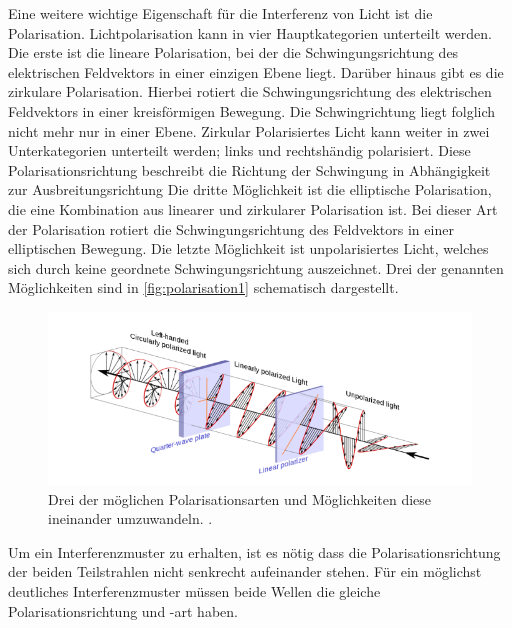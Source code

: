 Eine weitere wichtige Eigenschaft für die Interferenz von Licht ist die Polarisation. Lichtpolarisation kann in vier Hauptkategorien unterteilt werden. Die erste ist die lineare Polarisation, bei der die Schwingungsrichtung des elektrischen Feldvektors in einer einzigen Ebene liegt.
 Darüber hinaus gibt es die zirkulare Polarisation. Hierbei rotiert die Schwingungsrichtung des elektrischen Feldvektors in einer kreisförmigen Bewegung. Die Schwingrichtung liegt folglich nicht mehr nur in einer Ebene. Zirkular Polarisiertes Licht kann weiter in zwei Unterkategorien unterteilt werden; links und
 rechtshändig polarisiert. Diese Polarisationsrichtung beschreibt die Richtung der Schwingung in Abhängigkeit zur Ausbreitungsrichtung 
Die dritte Möglichkeit ist die elliptische Polarisation, die eine Kombination aus linearer und zirkularer Polarisation ist. Bei dieser Art der Polarisation rotiert die Schwingungsrichtung des Feldvektors in einer elliptischen Bewegung.
Die letzte Möglichkeit ist unpolarisiertes Licht, welches sich durch keine geordnete Schwingungsrichtung auszeichnet.  
Drei der genannten Möglichkeiten sind in \autoref{fig:polarisation1} schematisch dargestellt.

\begin{figure}
    \centering
   \includegraphics[width = 0.7 \linewidth]{Bilder/polarisation1.png}
    \caption{Drei der möglichen Polarisationsarten und Möglichkeiten diese ineinander umzuwandeln. \cite{Polarisation}.}
    \label{fig:polarisation1}
\end{figure}
Um ein Interferenzmuster zu erhalten, ist es nötig dass die Polarisationsrichtung der beiden Teilstrahlen nicht senkrecht aufeinander stehen. Für ein möglichst deutliches Interferenzmuster müssen beide Wellen die gleiche Polarisationsrichtung und -art haben.

